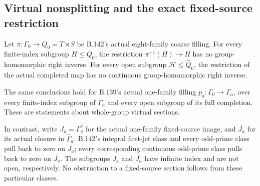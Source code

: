 \subsection*{Virtual nonsplitting and the exact fixed-source restriction}

\label{stmt:B143}
Let \(\pi:\Gamma_0\to Q_0=T\rtimes S\) be B.142's
actual eight-family coarse filling. For every finite-index
subgroup \(H\leq Q_0\), the restriction
\(\pi^{-1}(H)\to H\) has no group-homomorphic right inverse.
For every open subgroup \(\mathcal H\leq\widehat Q_0\),
the restriction of the actual completed map has no continuous
group-homomorphic right inverse.

The same conclusions hold for B.139's actual one-family filling
\(p_a:\Gamma_0\to\Gamma_a\), over every finite-index subgroup
of \(\Gamma_a\) and every open subgroup of its full completion.
These are statements about whole-group virtual sections.

In contrast, write \(J_a=\Gamma_a^\delta\) for the actual
one-family fixed-source image, and \(\overline{J_a}\) for
its actual closure in \(\widehat\Gamma_a\).
B.142's integral first-jet class and every odd-prime class
pull back to zero on \(J_a\); every corresponding continuous
odd-prime class pulls back to zero on \(\overline{J_a}\).
The subgroups \(J_a\) and \(\overline{J_a}\) have infinite
index and are not open, respectively. No obstruction to a
fixed-source section follows from these particular classes.

